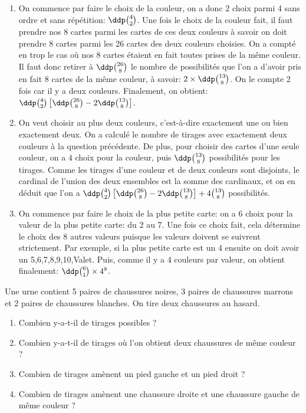 \documentclass[a4paper, 11pt]{article}
\begin{document}
\begin{correction}
\begin{enumerate}
		\item On commence par faire le choix de la couleur, on a donc 2 choix parmi 4 sans ordre et sans r\'ep\'etition: $\ddp \binom{4}{2}$. Une fois le choix de la couleur fait, il faut prendre nos 8 cartes parmi les cartes de ces deux couleurs \`a savoir on doit prendre 8 cartes parmi les 26 cartes des deux couleurs choisies. On a compt\'e en trop le cas o\`u nos 8 cartes \'etaient en fait toutes prises de la m\^eme couleur. Il faut donc retirer \`a $\ddp \binom{26}{8}$ le nombre de possibilit\'es que l'on a d'avoir pris en fait 8 cartes de la m\^eme couleur, \`a savoir: $2\times\ddp \binom{13}{8}$. On le compte 2 fois car il y a deux couleurs. Finalement, on obtient: $\ddp \binom{4}{2}\left\lbrack \ddp \binom{26}{8}-2\ddp \binom{13}{8}   \right\rbrack$.
		\item On veut choisir au plus deux couleurs, c'est-\`a-dire exactement une ou bien exactement deux. On a calcul\'e le nombre de tirages avec exactement deux couleurs \`a la question pr\'ec\'edente. De plus, pour choisir des cartes d'une seule couleur, on a $4$ choix pour la couleur, puis $\ddp \binom{13}{8}$ possibilit\'es pour les tirages. Comme les tirages d'une couleur et de deux couleurs sont disjoints, le cardinal de l'union des deux ensembles est la somme des cardinaux, et on en d\'eduit que l'on a $\ddp \binom{4}{2}\left\lbrack \ddp \binom{26}{8}-2\ddp \binom{13}{8}   \right\rbrack + 4 \binom{13}{8}$ possibilit\'es.
		\item On commence par faire le choix de la plus petite carte: on a 6 choix pour la valeur de la plus petite carte: du 2 au 7. Une fois ce choix fait, cela d\'etermine le choix des 8 autres valeurs puisque les valeurs doivent se suivrent strictement. Par exemple, si la plus petite carte est un 4 ensuite on doit avoir un 5,6,7,8,9,10,Valet. Puis, comme il y a 4 couleurs par valeur, on obtient finalement: $\ddp \binom{6}{1}\times 4^{8}$.
	\end{enumerate}
\end{correction}
\begin{exercice}  \;
	Une urne contient 5 paires de chaussures noires, 3 paires de chaussures marrons et 2 paires de chaussures blanches. On tire deux chaussures au hasard.
	\begin{enumerate}
		\item Combien y-a-t-il de tirages possibles ?
		\item Combien y-a-t-il de tirages o\`u l'on obtient deux chaussures de m\^eme couleur ?
		\item Combien de tirages am\`enent un pied gauche et un pied droit ?
		\item Combien de tirages am\`enent une chaussure droite et une chaussure gauche de m\^eme couleur ?
	\end{enumerate}
\end{exercice}
\end{document}
